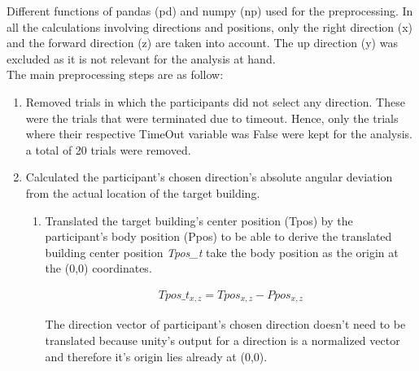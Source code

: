 Different functions of pandas {\emphasize (pd)} and numpy {\emphasize (np)} used for the preprocessing. In all the calculations involving directions and positions, only the right direction (x) and the forward direction (z) are taken into account. The up direction (y) was excluded as it is not relevant for the analysis at hand. \\

The main preprocessing steps are as follow:

\begin{enumerate}
	\item Removed trials in which the participants did not select any direction. These were the trials that were terminated due to timeout. Hence, only the trials where their respective TimeOut variable was False were kept for the analysis. a total of 20 trials were removed. \\
	
	\item Calculated the participant's chosen direction's absolute angular deviation from the actual location of the target building.
	
	\begin{enumerate}
		\item Translated the target building's center position {\emphasize(Tpos)} by the participant's body position {\emphasize(Ppos)} to be able to derive the translated building center position {\emph{Tpos\_t}} take the body position as the origin at the (0,0) coordinates.
		
			\begin{align*}
				Tpos\_t_{x,z}= Tpos_{x,z} - Ppos_{x,z}
			\end{align*}
		
		The direction vector of participant's chosen direction doesn't need to be translated because unity's output for a direction is a normalized vector and therefore it's origin lies already at (0,0).\\
		

\end{enumerate}
\end{enumerate}
